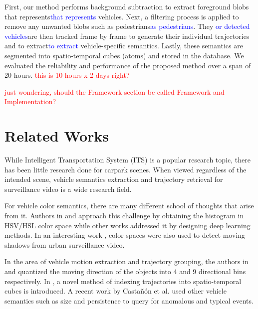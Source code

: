 \documentclass[runningheads]{llncs}
\newcommand{\ian}[1]{\textcolor{red}{#1}}
\newcommand{\lk}[1]{\textcolor{blue}{#1}}
\newcommand{\ian}[1]{}   %
\newcommand{\lk}[1]{}   %
\begin{document}
First, our method performs background subtraction to extract foreground blobs that represents\lk{that represents} vehicles. Next, a filtering process is applied to remove any unwanted blobs such as pedestrians\lk{as pedestrians}. They \lk{or detected vehicles}are then tracked frame by frame to generate their individual trajectories and to extract\lk{to extract} vehicle-specific semantics. Lastly, these semantics are segmented into spatio-temporal cubes (atoms) and stored in the database. We evaluated the reliability and performance of the proposed method over a span of 20 hours. \ian{this is 10 hours x 2 days right?}

\ian{just wondering, should the Framework section be called Framework and Implementation?}
 
 
 
\section{Related Works}
%
While Intelligent Transportation System (ITS) is a popular research topic, there has been little research done for carpark scenes. When viewed regardless of the intended scene, vehicle semantics extraction and trajectory retrieval for surveillance video is a wide research field. 

For vehicle color semantics, there are many different school of thoughts that arise from it. Authors in \cite{castanon2016retrieval} and \cite {feris2012large} approach this challenge by obtaining the histogram in HSV/HSL color space while other works \cite{dehghan2017view,hu2015vehicle,rachmadi2015vehicle} addressed it by designing deep learning methods. In an interesting work \cite{moghimi2014shadow}, color spaces were also used to detect moving shadows from urban surveillance video. 

In the area of vehicle motion extraction and trajectory grouping, the authors in \cite{zhang2013mining} and \cite{castanon2016retrieval} quantized the moving direction of the objects into 4 and 9 directional bins respectively. In \cite{d2015designing}, a novel method of indexing trajectories into spatio-temporal cubes is introduced. A recent work by Casta\~{n}\'{o}n et al. \cite{castanon2016retrieval} used other vehicle semantics such as size and persistence to query for anomalous and typical events.
\end{document}

